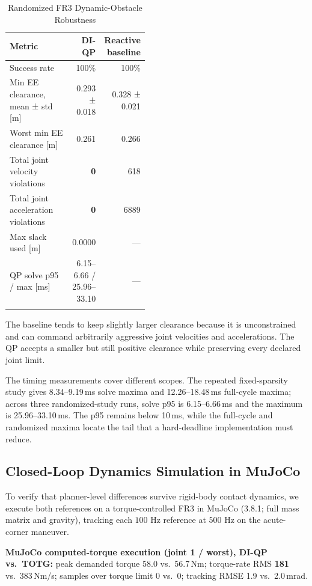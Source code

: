 {%
\begin{table}[t]
\caption{Randomized FR3 Dynamic-Obstacle Robustness}
\label{tab:fr3-randomized}
\centering
\footnotesize
\setlength{\tabcolsep}{3pt}
\begin{tabular}{@{}>{\raggedright\arraybackslash}p{0.46\linewidth}rr@{}}
\toprule\noalign{}
Metric & DI-QP & Reactive baseline \\
\midrule\noalign{}
Success rate & 100\% & 100\% \\
Min EE clearance, mean ± std {[}m{]} & 0.293 ± 0.018 & 0.328 ± 0.021 \\
Worst min EE clearance {[}m{]} & 0.261 & 0.266 \\
Total joint velocity violations & \textbf{0} & 618 \\
Total joint acceleration violations & \textbf{0} & 6889 \\
Max slack used {[}m{]} & 0.0000 & --- \\
QP solve p95 / max {[}ms{]} & 6.15--6.66 / 25.96--33.10 & --- \\
\bottomrule\noalign{}
\end{tabular}
\end{table}
}

The baseline tends to keep slightly larger clearance because it is
unconstrained and can command arbitrarily aggressive joint velocities
and accelerations. The QP accepts a smaller but still positive clearance
while preserving every declared joint limit.

The timing measurements cover different scopes. The repeated fixed-sparsity
study gives 8.34--9.19\,ms solve maxima and 12.26--18.48\,ms full-cycle
maxima; across three randomized-study runs, solve p95 is 6.15--6.66\,ms and
the maximum is 25.96--33.10\,ms. The p95 remains below 10\,ms, while the
full-cycle and randomized maxima locate the tail that a hard-deadline
implementation must reduce.

\subsection{Closed-Loop Dynamics Simulation in
MuJoCo}\label{h.-physical-execution-in-mujoco}

To verify that planner-level differences survive rigid-body contact
dynamics, we execute both references on a torque-controlled FR3 in
MuJoCo (3.8.1; full mass matrix and gravity), tracking each \(100\) Hz
reference at \(500\) Hz on the acute-corner maneuver.

\textbf{MuJoCo computed-torque execution (joint 1 / worst), DI-QP vs.\
TOTG:} peak demanded torque 58.0 vs.\ 56.7\,Nm; torque-rate RMS
\textbf{181} vs.\ 383\,Nm/s; samples over torque limit 0 vs.\ 0; tracking
RMSE 1.9 vs.\ 2.0\,mrad.


